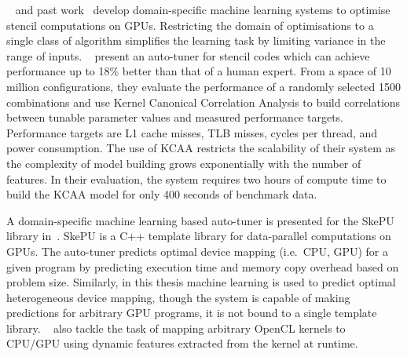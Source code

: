 %
\citeauthor{Lutz2013}~\cite{Lutz2013} and past work~\cite{Cummins2016a} develop domain-specific machine learning systems to optimise stencil computations on GPUs. Restricting the domain of optimisations to a single class of algorithm simplifies the learning task by limiting variance in the range of inputs.
\citeauthor{Ganapathi2009}~\cite{Ganapathi2009} present an auto-tuner for stencil codes which can achieve performance up to 18\% better than that of a human expert. From a space of 10 million configurations, they evaluate the performance of a randomly selected 1500 combinations and use Kernel Canonical Correlation Analysis to build correlations between tunable parameter values and measured performance targets. Performance targets are L1 cache misses, TLB misses, cycles per thread, and power consumption. The use of KCAA restricts the scalability of their system as the complexity of model building grows exponentially with the number of features. In their evaluation, the system requires two hours of compute time to build the KCAA model for only 400 seconds of benchmark data.

A domain-specific machine learning based auto-tuner is presented for the SkePU library in~\cite{Dastgeer2011b}. SkePU is a C++ template library for data-parallel computations on GPUs. The auto-tuner predicts optimal device mapping (i.e.\ CPU, GPU) for a given program by predicting execution time and memory copy overhead based on problem size. Similarly, in this thesis machine learning is used to predict optimal heterogeneous device mapping, though the system is capable of making predictions for arbitrary GPU programs, it is not bound to a single template library.
\citeauthor{Moren2018}~\cite{Moren2018} also tackle the task of mapping arbitrary OpenCL kernels to CPU/GPU using dynamic features extracted from the kernel at runtime.

